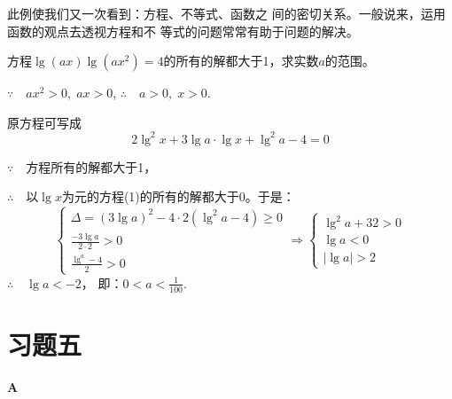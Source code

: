 \begin{note}
此例使我们又一次看到：方程、不等式、函数之
间的密切关系。一般说来，运用函数的观点去透视方程和不
等式的问题常常有助于问题的解决。
\end{note}    

\begin{example}
方程$\lg(ax)\lg(ax^2)=4$的所有的解都大于1，求实数$a$的范围。
\end{example}

\begin{solution}
$\because\quad ax^2>0,\; ax>0$, \qquad $\therefore\quad a>0,\; x>0$.

原方程可写成
\begin{equation}
   2\lg^2 x+3\lg a\cdot \lg x+\lg^2 a-4=0 \tag{1} 
\end{equation}

$\because\quad $方程所有的解都大于1，

$\therefore\quad $以$\lg x$为元的方程(1)的所有的解都大于0。于是：
\[\begin{cases}
\Delta =(3\lg a)^2-4\cdot 2(\lg^2 a-4)\ge 0\\
\frac{-3\lg a}{2\cdot 2}>0\\
\frac{\lg^a-4}{2}>0
\end{cases}\Longrightarrow \begin{cases}
    \lg^2 a+32>0\\
    \lg a<0\\
    |\lg a|>2
\end{cases}\]
$\therefore\quad \lg a<-2$，
即：$0<a<\frac{1}{100}$.
\end{solution}

\section*{习题五}
\begin{center}
    \bfseries A
\end{center}

